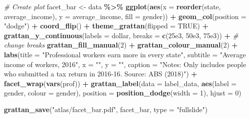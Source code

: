 \documentclass[
]{book}
\newenvironment{Shaded}{\begin{snugshade}}{\end{snugshade}}
\newcommand{\CommentTok}[1]{\textcolor[rgb]{0.56,0.35,0.01}{\textit{#1}}}
\newcommand{\DataTypeTok}[1]{\textcolor[rgb]{0.13,0.29,0.53}{#1}}
\newcommand{\DecValTok}[1]{\textcolor[rgb]{0.00,0.00,0.81}{#1}}
\newcommand{\FloatTok}[1]{\textcolor[rgb]{0.00,0.00,0.81}{#1}}
\newcommand{\KeywordTok}[1]{\textcolor[rgb]{0.13,0.29,0.53}{\textbf{#1}}}
\newcommand{\NormalTok}[1]{#1}
\newcommand{\OperatorTok}[1]{\textcolor[rgb]{0.81,0.36,0.00}{\textbf{#1}}}
\newcommand{\OtherTok}[1]{\textcolor[rgb]{0.56,0.35,0.01}{#1}}
\newcommand{\StringTok}[1]{\textcolor[rgb]{0.31,0.60,0.02}{#1}}
\begin{document}
\begin{Shaded}
\begin{Highlighting}[]
\CommentTok{\# Create plot}
\NormalTok{facet\_bar \textless{}{-}}\StringTok{ }\NormalTok{data }\OperatorTok{\%\textgreater{}\%}\StringTok{ }
\StringTok{  }\KeywordTok{ggplot}\NormalTok{(}\KeywordTok{aes}\NormalTok{(}\DataTypeTok{x =} \KeywordTok{reorder}\NormalTok{(state, average\_income),}
             \DataTypeTok{y =}\NormalTok{ average\_income,}
             \DataTypeTok{fill =}\NormalTok{ gender)) }\OperatorTok{+}\StringTok{ }
\StringTok{  }\KeywordTok{geom\_col}\NormalTok{(}\DataTypeTok{position =} \StringTok{"dodge"}\NormalTok{) }\OperatorTok{+}\StringTok{ }
\StringTok{  }\KeywordTok{coord\_flip}\NormalTok{() }\OperatorTok{+}\StringTok{ }
\StringTok{  }\KeywordTok{theme\_grattan}\NormalTok{(}\DataTypeTok{flipped =} \OtherTok{TRUE}\NormalTok{) }\OperatorTok{+}\StringTok{ }
\StringTok{  }\KeywordTok{grattan\_y\_continuous}\NormalTok{(}\DataTypeTok{labels =}\NormalTok{ dollar,}
                       \DataTypeTok{breaks =} \KeywordTok{c}\NormalTok{(}\FloatTok{25e3}\NormalTok{, }\FloatTok{50e3}\NormalTok{, }\FloatTok{75e3}\NormalTok{)) }\OperatorTok{+}\StringTok{  }\CommentTok{\# change breaks}
\StringTok{  }\KeywordTok{grattan\_fill\_manual}\NormalTok{(}\DecValTok{2}\NormalTok{) }\OperatorTok{+}\StringTok{ }
\StringTok{  }\KeywordTok{grattan\_colour\_manual}\NormalTok{(}\DecValTok{2}\NormalTok{) }\OperatorTok{+}\StringTok{ }
\StringTok{  }\KeywordTok{labs}\NormalTok{(}\DataTypeTok{title =} \StringTok{"Professional workers earn more in every state"}\NormalTok{,}
       \DataTypeTok{subtitle =} \StringTok{"Average income of workers, 2016"}\NormalTok{,}
       \DataTypeTok{x =} \StringTok{""}\NormalTok{,}
       \DataTypeTok{y =} \StringTok{""}\NormalTok{,}
       \DataTypeTok{caption =} \StringTok{"Notes: Only includes people who submitted a tax return in 2016{-}16. Source: ABS (2018)"}\NormalTok{) }\OperatorTok{+}\StringTok{ }
\StringTok{  }\KeywordTok{facet\_wrap}\NormalTok{(}\KeywordTok{vars}\NormalTok{(prof)) }\OperatorTok{+}\StringTok{ }
\StringTok{  }\KeywordTok{grattan\_label}\NormalTok{(}\DataTypeTok{data =}\NormalTok{ label\_data,}
                \KeywordTok{aes}\NormalTok{(}\DataTypeTok{label =}\NormalTok{ gender,}
                    \DataTypeTok{colour =}\NormalTok{ gender),}
                \DataTypeTok{position =} \KeywordTok{position\_dodge}\NormalTok{(}\DataTypeTok{width =} \DecValTok{1}\NormalTok{), }
                \DataTypeTok{hjust =} \DecValTok{0}\NormalTok{)}
\end{Highlighting}
\end{Shaded}

\begin{Shaded}
\begin{Highlighting}[]
\KeywordTok{grattan\_save}\NormalTok{(}\StringTok{"atlas/facet\_bar.pdf"}\NormalTok{, facet\_bar, }\DataTypeTok{type =} \StringTok{"fullslide"}\NormalTok{)}
\end{Highlighting}
\end{Shaded}
\end{document}
